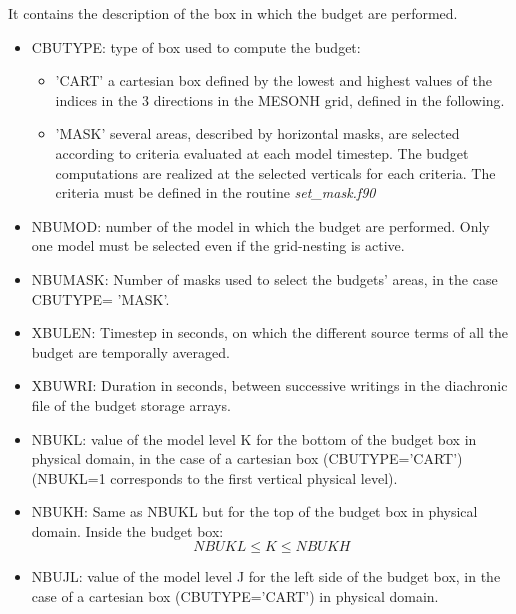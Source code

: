 It contains the description of the box in which the budget are performed. 


\begin{itemize}

\item
{}
CBUTYPE: type of box used to compute the budget:
\begin{itemize}
\item
'CART' a cartesian box defined by the lowest and highest values of the indices
 in the 3 directions in the MESONH grid, defined in the following.
\item
'MASK' several areas, described by horizontal masks, are selected according to
 criteria evaluated at each model timestep. 
The budget computations are realized at the selected verticals for each
criteria. The criteria must be defined in the routine {\it set\_mask.f90}
\end{itemize}

\item
NBUMOD:  number of the model in which the
budget are performed. Only one model must be selected even if the grid-nesting
is active.

\item
NBUMASK: 
Number of masks used to select the budgets' areas, in the case CBUTYPE= 'MASK'. 

\item
XBULEN: 
Timestep  in seconds, on which the different source terms of all the
budget are temporally averaged.

\item
XBUWRI: 
Duration in seconds, between successive writings in the diachronic file
of the budget storage arrays.

\item
{}
NBUKL: value of the model level K for the bottom of the budget box in physical domain, in the case
of a cartesian box (CBUTYPE='CART') (NBUKL=1 corresponds to the first vertical physical level).

\item
{}
NBUKH: Same as NBUKL but for the top of the budget box in physical domain. Inside the budget box:
$$ NBUKL \leq K \leq NBUKH $$

\item
{}
NBUJL: value of the model level J for the left side of the budget box, in the case
of a cartesian box (CBUTYPE='CART') in physical domain.


\end{itemize}
